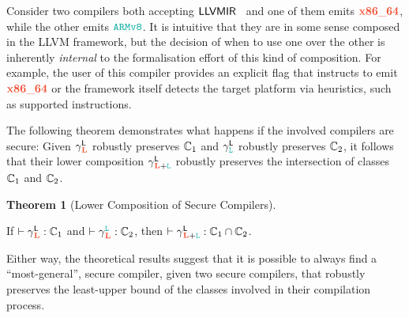 \documentclass[acmsmall]{acmart}
\theoremstyle{definition}
\newtheorem{theorem}{Theorem}[section]
\begin{document}
 Consider two compilers both accepting $\src{LLVM IR}$~\cite{lattner2004llvm} and one of them emits $\trg{x86\_64}$, while the other emits $\obj{ARMv8}$.
 It is intuitive that they are in some sense composed in the LLVM framework, but the decision of when to use one over the other is inherently {\em internal} to the formalisation effort of this kind of composition.
 For example, the user of this compiler provides an explicit flag that instructs to emit $\trg{x86\_64}$ or the framework itself detects the target platform via heuristics, such as supported instructions.

 The following theorem demonstrates what happens if the involved compilers are secure:
Given {$\cc{\src{L}}{\trg{L}}$ robustly preserves $\class[_{1}]$} and {$\cc{\src{L}}{\obj{L}}$ robustly preserves $\class[_{2}]$}, it follows that {their lower composition $\cc{\src{L}}{\trg{L}+\obj{L}}$ robustly preserves the intersection of classes $\class[_{1}]$ and $\class[_{2}]$}.

\begin{theorem}[Lower Composition of Secure Compilers]\label{thm:lrtp}
  $\;$ 

  If {$\rtp{\cc{\src{L}}{\trg{L}}}{\class[_{1}]}$} and {$\rtp{\cc{\obj{L}}{\trg{L}}}{\class[_{2}]}$}, then {$\rtp{\cc{\src{L}}{\trg{L}+\obj{L}}}{\class[_{1}]\cap\class[_{2}]}$}. %
\end{theorem}

Either way, the theoretical results suggest that it is possible to always find a ``most-general'', secure compiler, given two secure compilers, that robustly preserves the least-upper bound of the classes involved in their compilation process.



\end{document}
